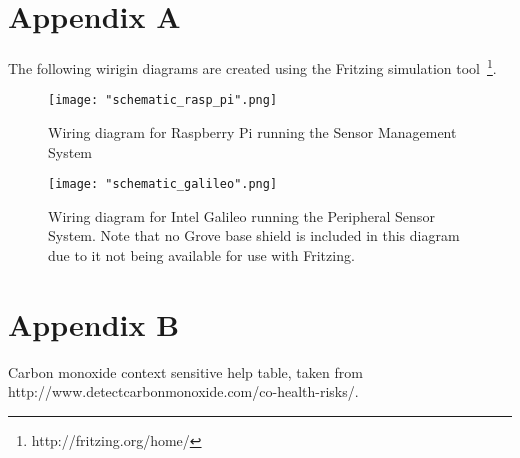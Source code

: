 \documentclass{article}
\begin{document}
\newpage
\section{Appendix A}
\label{sec:appendix_a}
The following wirigin diagrams are created using the Fritzing simulation tool~\footnote{http://fritzing.org/home/}.  


\begin{figure}[h!btp]
\centering
\texttt{[image: "schematic\_rasp\_pi".png]}
\caption{Wiring diagram for Raspberry Pi running the Sensor Management System}
\label{fig:schematic_rasp_pi}
\end{figure}

\begin{figure}[h!btp]
\centering
\texttt{[image: "schematic\_galileo".png]}
\caption{Wiring diagram for Intel Galileo running the Peripheral Sensor System. Note that no Grove base shield is included in this diagram due to it not being available for use with Fritzing. }
\label{fig:schematic_galileo}
\end{figure}

\newpage
\section{Appendix B}
\label{sec:appendix_b}
Carbon monoxide context sensitive help table, taken from http://www.detectcarbonmonoxide.com/co-health-risks/.
\end{document}
